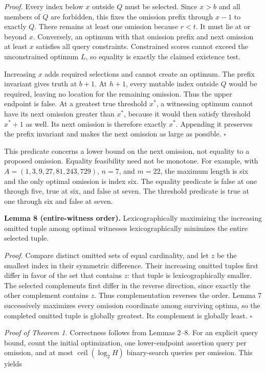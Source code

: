 \documentclass[
  11pt,
  letterpaper,
]{article}
\begin{document}
\emph{Proof.} Every index below \(x\) outside \(Q\) must be selected.
Since \(x>b\) and all members of \(Q\) are forbidden, this fixes the
omission prefix through \(x-1\) to exactly \(Q\). There remains at least
one omission because \(r<t\). It must lie at or beyond \(x\).
Conversely, an optimum with that omission prefix and next omission at
least \(x\) satisfies all query constraints. Constrained scores cannot
exceed the unconstrained optimum \(L\), so equality is exactly the
claimed existence test.

Increasing \(x\) adds required selections and cannot create an optimum.
The prefix invariant gives truth at \(b+1\). At \(h+1\), every mutable
index outside \(Q\) would be required, leaving no location for the
remaining omission. Thus the upper endpoint is false. At a greatest true
threshold \(x^*\), a witnessing optimum cannot have its next omission
greater than \(x^*\), because it would then satisfy threshold \(x^*+1\)
as well. Its next omission is therefore exactly \(x^*\). Appending it
preserves the prefix invariant and makes the next omission as large as
possible. \(\square\)

This predicate concerns a lower bound on the next omission, not equality
to a proposed omission. Equality feasibility need not be monotone. For
example, with \(A=(1,3,9,27,81,243,729)\), \(n=7\), and \(m=22\), the
maximum length is six and the only optimal omission is index six. The
equality predicate is false at one through five, true at six, and false
at seven. The threshold predicate is true at one through six and false
at seven.

\textbf{Lemma 8 (entire-witness order).} Lexicographically maximizing
the increasing omitted tuple among optimal witnesses lexicographically
minimizes the entire selected tuple.

\emph{Proof.} Compare distinct omitted sets of equal cardinality, and
let \(z\) be the smallest index in their symmetric difference. Their
increasing omitted tuples first differ in favor of the set that contains
\(z\): that tuple is lexicographically smaller. The selected complements
first differ in the reverse direction, since exactly the other
complement contains \(z\). Thus complementation reverses the order.
Lemma 7 successively maximizes every omission coordinate among surviving
optima, so the completed omitted tuple is globally greatest. Its
complement is globally least. \(\square\)

\emph{Proof of Theorem 1.} Correctness follows from Lemmas 2--8. For an
explicit query bound, count the initial optimization, one lower-endpoint
assertion query per omission, and at most
\(\operatorname{ceil}(\log_2 H)\) binary-search queries per omission.
This yields
\end{document}
